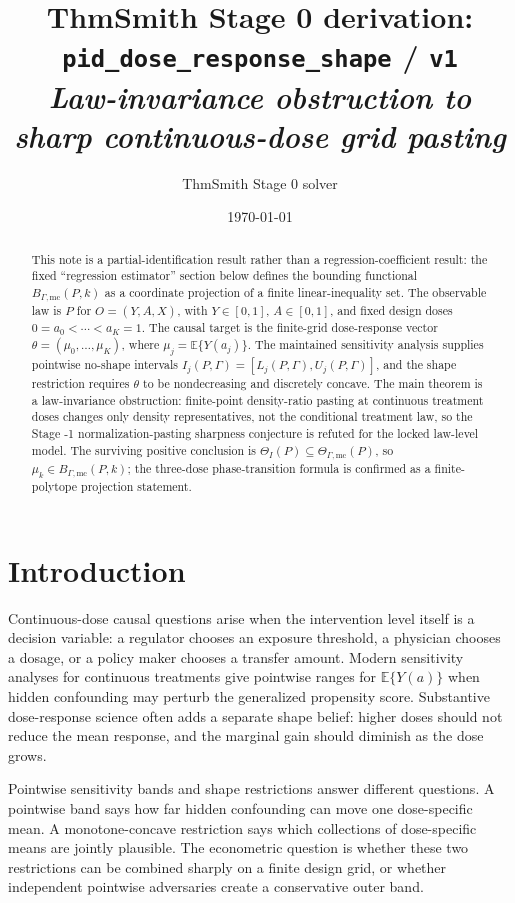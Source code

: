 \documentclass[11pt]{article}
\title{ThmSmith Stage 0 derivation: \texttt{pid\_dose\_response\_shape} / \texttt{v1}%
  \\ \large\textit{Law-invariance obstruction to sharp continuous-dose grid pasting}}
\author{ThmSmith Stage 0 solver}
\date{\today}
\newcommand{\E}{\mathbb{E}}
\theoremstyle{definition}
\theoremstyle{plain}
\theoremstyle{remark}
\begin{document}
\maketitle


\begin{abstract}
This note is a partial-identification result rather than a regression-coefficient result: the fixed ``regression estimator'' section below defines the bounding functional
\(B_{\Gamma,\mathrm{mc}}(P,k)\) as a coordinate projection of a finite linear-inequality set.  The observable law is \(P\) for \(O=(Y,A,X)\), with \(Y\in[0,1]\), \(A\in[0,1]\), and fixed design doses \(0=a_0<\cdots<a_K=1\).  The causal target is the finite-grid dose-response vector \(\theta=(\mu_0,\ldots,\mu_K)\), where \(\mu_j=\E\{Y(a_j)\}\).  The maintained sensitivity analysis supplies pointwise no-shape intervals \(I_j(P,\Gamma)=[L_j(P,\Gamma),U_j(P,\Gamma)]\), and the shape restriction requires \(\theta\) to be nondecreasing and discretely concave.  The main theorem is a law-invariance obstruction: finite-point density-ratio pasting at continuous treatment doses changes only density representatives, not the conditional treatment law, so the Stage -1 normalization-pasting sharpness conjecture is refuted for the locked law-level model.  The surviving positive conclusion is
\(\Theta_I(P)\subseteq\Theta_{\Gamma,\mathrm{mc}}(P)\), so \(\mu_k\in B_{\Gamma,\mathrm{mc}}(P,k)\); the three-dose phase-transition formula is confirmed as a finite-polytope projection statement.
\end{abstract}

\section{Introduction}
Continuous-dose causal questions arise when the intervention level itself is a decision variable: a regulator chooses an exposure threshold, a physician chooses a dosage, or a policy maker chooses a transfer amount.  Modern sensitivity analyses for continuous treatments give pointwise ranges for \(\E\{Y(a)\}\) when hidden confounding may perturb the generalized propensity score.  Substantive dose-response science often adds a separate shape belief: higher doses should not reduce the mean response, and the marginal gain should diminish as the dose grows.

Pointwise sensitivity bands and shape restrictions answer different questions.  A pointwise band says how far hidden confounding can move one dose-specific mean.  A monotone-concave restriction says which collections of dose-specific means are jointly plausible.  The econometric question is whether these two restrictions can be combined sharply on a finite design grid, or whether independent pointwise adversaries create a conservative outer band.
\end{document}
